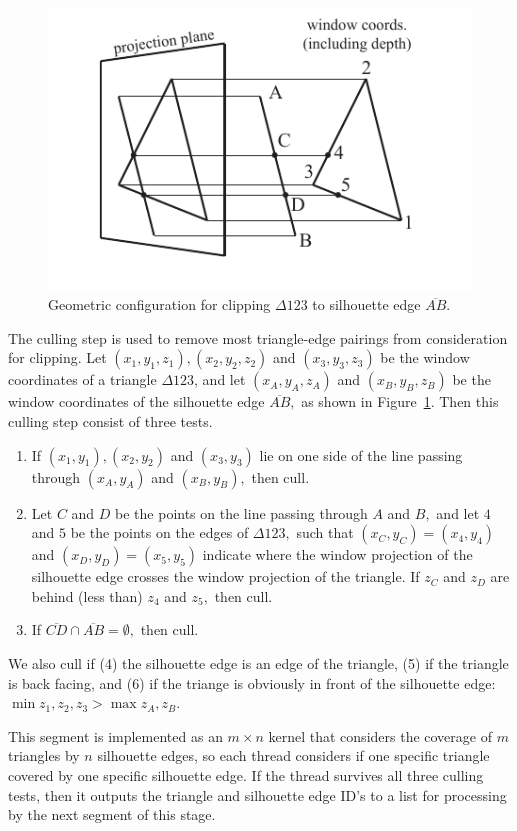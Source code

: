 \documentclass[review]{acmsiggraph}
\begin{document}
\begin{figure} \centering
\includegraphics{images/clipgeom.pdf}
\caption{Geometric configuration for clipping $\Delta 123$ to silhouette edge
$\overline{AB}.$}
\label{fig:clipgeom}
\end{figure}

The culling step is used to remove most triangle-edge pairings from
consideration for clipping.
Let $(x_1,y_1,z_1), (x_2,y_2,z_2)$ and $(x_3,y_3,z_3)$ be the window
coordinates of a triangle $\Delta 123$, and let $(x_A,y_A,z_A)$ and
$(x_B,y_B,z_B)$ be the window coordinates of the silhouette edge
$\overline{AB},$ as shown in Figure~\ref{fig:clipgeom}. Then this culling step
consist of three tests.
\begin{enumerate}
\item If $(x_1,y_1), (x_2,y_2)$ and $(x_3,y_3)$ lie on one side of the line
passing through $(x_A,y_A)$ and $(x_B,y_B),$ then cull.
\item Let $C$ and $D$ be the points on the line passing through $A$ and $B,$
and let $4$ and $5$ be the points on the edges of $\Delta 123,$ such that
$(x_C,y_C) = (x_4,y_4)$ and $(x_D,y_D) = (x_5,y_5)$ indicate where the
window projection of the silhouette edge crosses the window projection of the
triangle. If $z_C$ and $z_D$ are behind (less than) $z_4$ and $z_5,$ then cull.
\item If $\overline{CD} \cap \overline{AB} = \emptyset,$ then cull.
\end{enumerate}

We also cull if (4) the silhouette edge is an edge of the triangle, (5) if the
triangle is back facing, and (6) if the triange is obviously in front of the
silhouette edge: $\min z_1,z_2,z_3 > \max z_A,z_B.$

This segment is implemented as an $m \times n$ kernel that considers the
coverage of $m$ triangles by $n$ silhouette edges, so each thread considers
if one specific triangle covered by one specific silhouette edge. If the
thread survives all three culling tests, then it outputs the triangle and
silhouette edge ID's to a list for processing by the next segment of this
stage.
\end{document}
